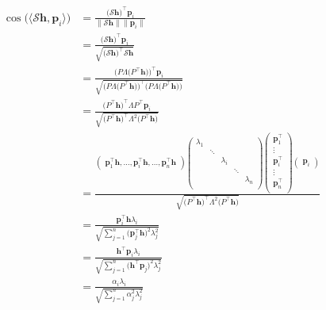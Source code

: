 \documentclass[nohyperref]{article}
\theoremstyle{plain}
\theoremstyle{definition}
\theoremstyle{remark}
\begin{document}
\begin{equation}
	\nonumber
	\begin{aligned}
		\cos\bigl(\langle \mathcal S\bm h, \bm p_i\rangle\bigr)&=\frac{\bigl(\mathcal S\bm h\bigr)^{\top} \bm p_i}{\| \mathcal S\bm h\|\|\bm p_i\|}\\
		&=\frac{\bigl(\mathcal S\bm h\bigr)^{\top} \bm p_i}{\sqrt{\bigl(\mathcal S\bm h\bigr)^{\top} \mathcal S\bm h}}\\
		&=\frac{\bigl(P\Lambda\bigl(P^{\top}\bm h\bigr)\bigr)^{\top} \bm p_i}
		{\sqrt{\bigl(P\Lambda\bigl(P^{\top}\bm h\bigr)\bigr)^{\top}\bigl(P\Lambda\bigl(P^{\top}\bm h\bigr)\bigr)}}\\
		&=\frac{\bigl(P^{\top}\bm h\bigr)^{\top}\Lambda P^{\top} \bm p_i}
		{\sqrt{\bigl(P^{\top}\bm h\bigr)^{\top}\Lambda^2\bigl(P^{\top}\bm h\bigr)}}\\
		&=\frac{
			\begin{pmatrix}
				\bm p_1^{\top}\bm h,\dots,\bm p_i^{\top}\bm h,\dots,\bm p_n^{\top}\bm h
			\end{pmatrix}
			\begin{pmatrix}
				\lambda_1 \\
				& \ddots \\
				& & \lambda_i \\
				& & & \ddots \\
				& & & & \lambda_n \\
			\end{pmatrix}
			\begin{pmatrix}
				\bm p_1^{\top} \\
				\vdots \\
				\bm p_i^{\top} \\
				\vdots \\
				\bm p_n^{\top} \\
			\end{pmatrix}
			\begin{pmatrix}
				\bm p_i
			\end{pmatrix}
		}{
			\sqrt{\bigl(P^{\top}\bm h\bigr)^{\top}\Lambda^2\bigl(P^{\top}\bm h\bigr)}} \\
		&=\frac{\bm p_i^{\top}\bm h \lambda_i}
		{\sqrt{\sum^n_{j=1}\bigl(\bm p_j^{\top}\bm h\bigr)^2\lambda_j^2}} \\
		&=\frac{\bm h^{\top}\bm p_i \lambda_i}
		{\sqrt{\sum^n_{j=1}\bigl(\bm h^{\top}\bm p_j\bigr)^2\lambda_j^2}}\\
		&=\frac{\alpha_i\lambda_i}{\sqrt{\sum^n_{j=1}\alpha_j^2\lambda_j^2}}
	\end{aligned}
\end{equation}
\end{document}
